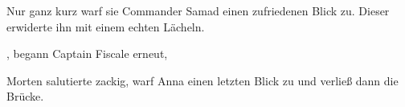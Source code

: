 \par

Nur ganz kurz warf sie Commander Samad einen zufriedenen Blick zu. Dieser erwiderte ihn mit einem echten Lächeln.

\par

, begann Captain Fiscale erneut, 

\par

Morten salutierte zackig, warf Anna einen letzten Blick zu und verließ dann die Brücke.
